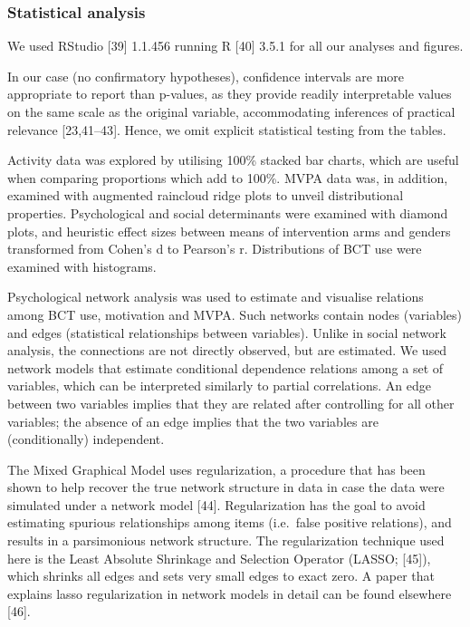 \documentclass[english,man,floatsintext]{apa6}
\begin{document}
\hypertarget{statistical-analysis}{%
\subsubsection{Statistical analysis}\label{statistical-analysis}}

We used RStudio {[}39{]} 1.1.456 running R {[}40{]} 3.5.1 for all our analyses and figures.

In our case (no confirmatory hypotheses), confidence intervals are more appropriate to report than p-values, as they provide readily interpretable values on the same scale as the original variable, accommodating inferences of practical relevance {[}23,41--43{]}. Hence, we omit explicit statistical testing from the tables.

Activity data was explored by utilising 100\% stacked bar charts, which are useful when comparing proportions which add to 100\%. MVPA data was, in addition, examined with augmented raincloud ridge plots to unveil distributional properties. Psychological and social determinants were examined with diamond plots, and heuristic effect sizes between means of intervention arms and genders transformed from Cohen's d to Pearson's r. Distributions of BCT use were examined with histograms.

Psychological network analysis was used to estimate and visualise relations among BCT use, motivation and MVPA. Such networks contain nodes (variables) and edges (statistical relationships between variables). Unlike in social network analysis, the connections are not directly observed, but are estimated. We used network models that estimate conditional dependence relations among a set of variables, which can be interpreted similarly to partial correlations. An edge between two variables implies that they are related after controlling for all other variables; the absence of an edge implies that the two variables are (conditionally) independent.

The Mixed Graphical Model uses regularization, a procedure that has been shown to help recover the true network structure in data in case the data were simulated under a network model {[}44{]}. Regularization has the goal to avoid estimating spurious relationships among items (i.e.~false positive relations), and results in a parsimonious network structure. The regularization technique used here is the Least Absolute Shrinkage and Selection Operator (LASSO; {[}45{]}), which shrinks all edges and sets very small edges to exact zero. A paper that explains lasso regularization in network models in detail can be found elsewhere {[}46{]}.
\end{document}
